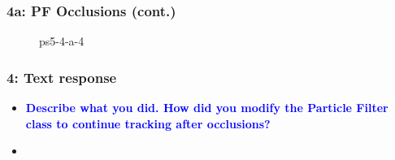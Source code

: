 \documentclass[../report.tex]{subfiles}
\begin{document}
    \begin{frame}
        \frametitle{4a: PF Occlusions (cont.)}
        \begin{figure}[!htb]
            \centering
            \caption{ps5-4-a-4}
        \end{figure}
    \end{frame}

    \begin{frame}[t]
        \frametitle{4: Text response}
        \begin{normalsize}
            \begin{itemize}
                \setlength\itemsep{1em}\fontsize{6pt}{6pt}

                \item[]{\textbf{\selectfont\textcolor{blue}{ Describe what you did. How did you modify the Particle Filter class to continue tracking after occlusions? }}}
                
                \item[]\textbf{}
            \end{itemize}
        \end{normalsize}
    \end{frame}

    
\end{document}
